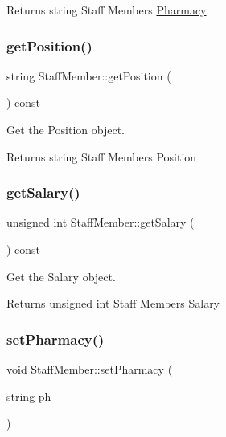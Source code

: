 \begin{DoxyReturn}{Returns}
string Staff Member\textquotesingle{}s \hyperlink{classPharmacy}{Pharmacy} 
\end{DoxyReturn}
\mbox{\label{classStaffMember_a7ae61e5f21a3131f3ed6d9e2be0f445f}} 
\subsubsection{\texorpdfstring{get\+Position()}{getPosition()}}
{\footnotesize\ttfamily string Staff\+Member\+::get\+Position (\begin{DoxyParamCaption}{ }\end{DoxyParamCaption}) const}



Get the Position object. 

\begin{DoxyReturn}{Returns}
string Staff Member\textquotesingle{}s Position 
\end{DoxyReturn}
\mbox{\label{classStaffMember_affc762af53afc6fcbb7c29a362de05bc}} 
\subsubsection{\texorpdfstring{get\+Salary()}{getSalary()}}
{\footnotesize\ttfamily unsigned int Staff\+Member\+::get\+Salary (\begin{DoxyParamCaption}{ }\end{DoxyParamCaption}) const}



Get the Salary object. 

\begin{DoxyReturn}{Returns}
unsigned int Staff Member\textquotesingle{}s Salary 
\end{DoxyReturn}
\mbox{\label{classStaffMember_a628c894f76e94a3a9370e610ccdf78fe}} 
\subsubsection{\texorpdfstring{set\+Pharmacy()}{setPharmacy()}}
{\footnotesize\ttfamily void Staff\+Member\+::set\+Pharmacy (\begin{DoxyParamCaption}\item[{string}]{ph }\end{DoxyParamCaption})}



